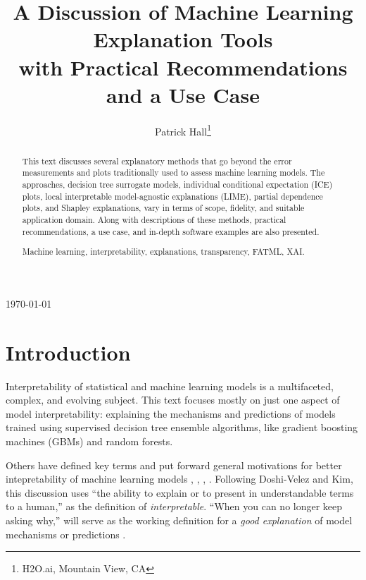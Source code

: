 \documentclass[11pt]{asaproc}
\title{A Discussion of Machine Learning Explanation Tools\\ with Practical Recommendations and a Use Case}
\author{Patrick Hall\thanks{H2O.ai, Mountain View, CA}
}
\begin{document}
\maketitle
\centerline{\today}

\vspace{15pt}

\begin{abstract}

This text discusses several explanatory methods that go beyond the error measurements and plots 			traditionally used to assess machine learning models. The approaches, decision tree surrogate models, individual conditional expectation (ICE) plots, local interpretable model-agnostic explanations (LIME), partial dependence plots, and Shapley explanations, vary in terms of scope, fidelity, and suitable application domain. Along with descriptions of these methods, practical recommendations, a use case, and in-depth software examples are also presented.

\begin{keywords}
Machine learning, interpretability, explanations, transparency, FATML, XAI.
\end{keywords}
\end{abstract}

\section{Introduction}

Interpretability of statistical and machine learning models is a multifaceted, complex, and evolving subject. This text focuses mostly on just one aspect of model interpretability: explaining the mechanisms and predictions of models trained using supervised decision tree ensemble algorithms, like gradient boosting machines (GBMs) and random forests. 

Others have defined key terms and put forward general motivations for better intepretability of machine learning models \cite{been_kim1}, \cite{gilpin2018explaining}, \cite{guidotti2018survey}, \cite{lipton1}. Following Doshi-Velez and Kim, this discussion uses ``the ability to explain or to present in understandable terms to a human,'' as the definition of \textit{interpretable}. ``When you can no longer keep asking why,'' will serve as the working definition for a \textit{good explanation} of model mechanisms or predictions \cite{gilpin2018explaining}. 
	
\end{document}
